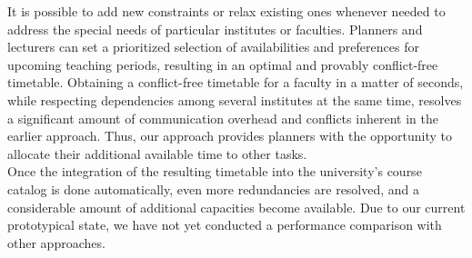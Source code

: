 \documentclass{easychair}
\begin{document}
  It is possible to add new constraints or relax existing ones whenever needed to address the special needs of particular institutes or faculties. 
  Planners and lecturers can set a prioritized selection of availabilities and preferences for upcoming teaching periods, resulting in an optimal and provably conflict-free timetable.
  Obtaining a conflict-free timetable for a faculty in a matter of seconds, while respecting dependencies among several institutes at the same time, resolves a significant amount of communication overhead and conflicts inherent in the earlier approach. 
  Thus, our approach provides planners with the opportunity to allocate their additional available time to other tasks. \\
  Once the integration of the resulting timetable into the university's course catalog is done automatically, even more redundancies are resolved, and a considerable amount of additional capacities become available. 
  Due to our current prototypical state, we have not yet conducted a performance comparison with other approaches\cite{feutrier23a}. 




\end{document}
